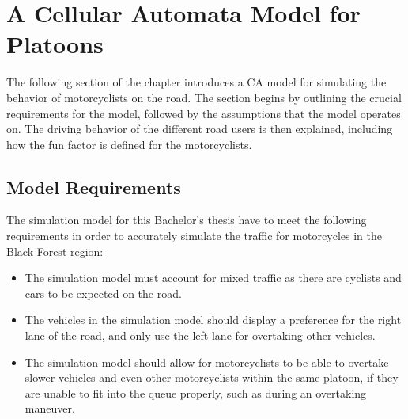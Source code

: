 \chapter{A Cellular Automata Model for Platoons}
\label{chapter:A Cellular Automata Model for Platoons}
The following section of the chapter introduces a CA model for simulating the behavior of motorcyclists on the road. The section begins by outlining the crucial requirements for the model, followed by the assumptions that the model operates on. The driving behavior of the different road users is then explained, including how the fun factor is defined for the motorcyclists.

\section{Model Requirements}
\label{sec:Model Requirements}
The simulation model for this Bachelor's thesis have to meet the following requirements in order to accurately simulate the traffic for motorcycles in the Black Forest region:
\begin{itemize}
    \item The simulation model must account for mixed traffic as there are cyclists and cars to be expected on the road. 
    
    \item The vehicles in the simulation model should display a preference for the right lane of the road, and only use the left lane for overtaking other vehicles.
    \item The simulation model should allow for motorcyclists to be able to overtake slower vehicles and even other motorcyclists within the same platoon, if they are unable to fit into the queue properly, such as during an overtaking maneuver.
\end{itemize}

